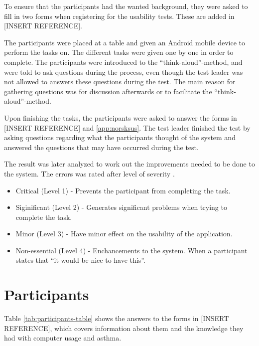 To ensure that the participants had the wanted background, they were asked to fill in two forms when registering for the usability tests. These are added in [INSERT REFERENCE].



The participants were placed at a table and given an Android mobile device to perform the tasks on. The different tasks were given one by one in order to complete. The participants were introduced to the ``think-aloud''-method, and were told to ask questions during the process, even though the test leader was not allowed to answers these questions during the test. The main reason for gathering questions was for discussion afterwards or to facilitate the ``think-aloud''-method. 

Upon finishing the tasks, the participants were asked to answer the forms in [INSERT REFERENCE] and \ref{app:norsksus}. The test leader finished the test by asking questions regarding what the participants thought of the system and answered the questions that may have occurred during the test. 

The result was later analyzed to work out the improvements needed to be done to the system. The errors was rated after level of severity \cite{dumas1995practical}. 

\begin{itemize}
\item{Critical (Level 1) - Prevents the participant from completing the task.}
\item{Siginificant (Level 2) - Generates significant problems when trying to complete the task.}
\item{Minor (Level 3) - Have minor effect on the usability of the application.}
\item{Non-essential (Level 4) - Enchancements to the system. When a participant states that ``it would be nice to have this''.}
\end{itemize}


\section{Participants}
\label{sec:participants}
Table \ref{tab:participants-table} shows the answers to the forms in [INSERT REFERENCE], which covers information about them and the knowledge they had with computer usage and asthma.

